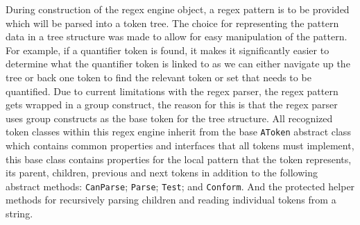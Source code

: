 During construction of the regex engine object, a regex pattern is to be provided which will be parsed into a token tree. The choice for representing the pattern data in a tree structure was made to allow for easy manipulation of the pattern. For example, if a quantifier token is found, it makes it significantly easier to determine what the quantifier token is linked to as we can either navigate up the tree or back one token to find the relevant token or set that needs to be quantified.
Due to current limitations with the regex parser, the regex pattern gets wrapped in a group construct, the reason for this is that the regex parser uses group constructs as the base token for the tree structure. All recognized token classes within this regex engine inherit from the base \texttt{AToken} abstract class which contains common properties and interfaces that all tokens must implement, this base class contains properties for the local pattern that the token represents, its parent, children, previous and next tokens in addition to the following abstract methods: \texttt{CanParse}; \texttt{Parse}; \texttt{Test}; and \texttt{Conform}. And the protected helper methods for recursively parsing children and reading individual tokens from a string.

